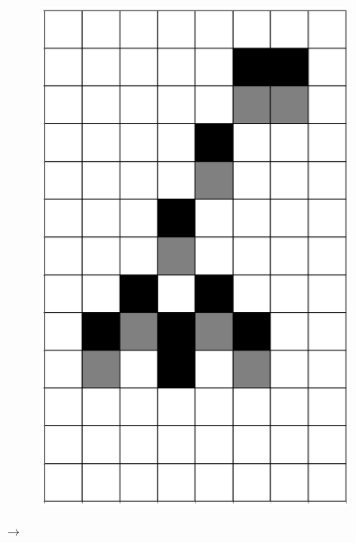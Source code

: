 \documentclass[12pt]{article}
\numberwithin{figure}{section} %
\begin{document}
\begin{figure}[H]
\begin{subfigure}{0.3\textwidth}
     		\includegraphics[angle=270,width=\linewidth]{Section4/13.2}
     		\subcaption{}
   	\end{subfigure}
      	{\LARGE$\xrightarrow{}$}
      	\newline
   	\setcounter{subfigure}{0}
     	\begin{subfigure}{0.3\textwidth}
     		\centering

\end{subfigure}
\end{figure}
\end{document}
